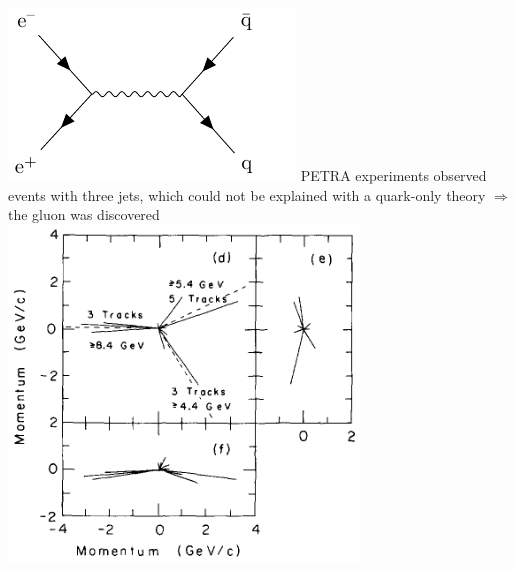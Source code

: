 \documentclass[10pt,t]{beamer}
\begin{document}
\begin{frame}
\begin{columns}
    \includegraphics[width=\textwidth,page=4]{gluon-feynman}
PETRA experiments observed events with three jets, which could not be explained with a quark-only theory $\Rightarrow$ the gluon was discovered \\[1ex]
    \centering\includegraphics[width=0.7\textwidth]{gluon-threejets}
\end{columns}
\vspace*{-18pt}
\end{frame}
\end{document}
